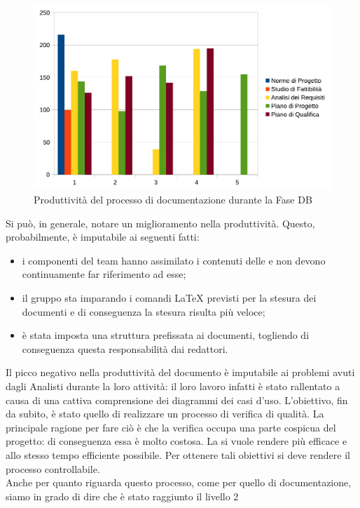 				\begin{figure}[H]
					\centering
					\includegraphics[width=12cm]{PianoDiQualifica/Pics/ProduttivitaDocumentazioneFaseA.pdf}
					\caption{Produttività del processo di documentazione durante la Fase DB}
				\end{figure}
				Si può, in generale, notare un miglioramento nella produttività. Questo, probabilmente, è imputabile ai seguenti fatti:
				\begin{itemize}
					\item i componenti del team hanno assimilato i contenuti delle  e non devono continuamente far 
					riferimento ad esse;
					\item il gruppo sta imparando i comandi \LaTeX{} previsti per la stesura dei documenti e di conseguenza la stesura risulta più veloce;
					\item è stata imposta una struttura prefissata ai documenti, togliendo di conseguenza questa responsabilità dai redattori.
				\end{itemize}
				Il picco negativo nella produttività del documento  è imputabile ai problemi avuti dagli Analisti durante 
				la loro attività: il loro lavoro infatti è stato rallentato a causa di una cattiva comprensione dei diagrammi dei casi d'uso.
				L'obiettivo, fin da subito, è stato quello di realizzare un processo di verifica di qualità. La principale ragione per fare ciò è che la 
				verifica occupa una parte cospicua del progetto: di conseguenza essa è molto costosa. La si vuole rendere più efficace e allo stesso 
				tempo efficiente possibile. Per ottenere tali obiettivi si deve rendere il processo controllabile.\\
				Anche per quanto riguarda questo processo, come per quello di documentazione, siamo in grado di dire che è stato raggiunto il livello 2 

